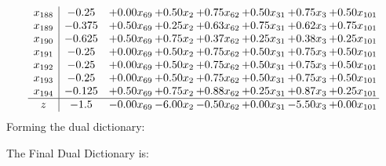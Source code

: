 \documentclass[8pt]{article}
\begin{document}
\[\begin{array}{c| c c@{\hskip 2pt} c@{\hskip 2pt} c@{\hskip 2pt} c@{\hskip 2pt} c@{\hskip 2pt} c@{\hskip 2pt} }
 x_{188}   &  -0.25 & +  0.00 x_{69} & +  0.50 x_{2} & +  0.75 x_{62} & +  0.50 x_{31} & +  0.75 x_{3} & +  0.50 x_{101}\\
 x_{189}   &  -0.375 & +  0.50 x_{69} & +  0.25 x_{2} & +  0.63 x_{62} & +  0.75 x_{31} & +  0.62 x_{3} & +  0.75 x_{101}\\
 x_{190}   &  -0.625 & +  0.50 x_{69} & +  0.75 x_{2} & +  0.37 x_{62} & +  0.25 x_{31} & +  0.38 x_{3} & +  0.25 x_{101}\\
 x_{191}   &  -0.25 & +  0.00 x_{69} & +  0.50 x_{2} & +  0.75 x_{62} & +  0.50 x_{31} & +  0.75 x_{3} & +  0.50 x_{101}\\
 x_{192}   &  -0.25 & +  0.00 x_{69} & +  0.50 x_{2} & +  0.75 x_{62} & +  0.50 x_{31} & +  0.75 x_{3} & +  0.50 x_{101}\\
 x_{193}   &  -0.25 & +  0.00 x_{69} & +  0.50 x_{2} & +  0.75 x_{62} & +  0.50 x_{31} & +  0.75 x_{3} & +  0.50 x_{101}\\
 x_{194}   &  -0.125 & +  0.50 x_{69} & +  0.75 x_{2} & +  0.88 x_{62} & +  0.25 x_{31} & +  0.87 x_{3} & +  0.25 x_{101}\\
\hline
z    &  -1.5 & -0.00 x_{69} & -6.00 x_{2} & -0.50 x_{62} & +  0.00 x_{31} & -5.50 x_{3} & +  0.00 x_{101}\\
\end{array}\]
Forming the dual dictionary:

The Final Dual Dictionary is: 
\end{document}
